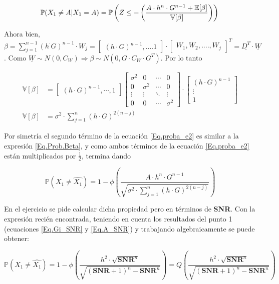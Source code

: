 			\begin{equation}
				\mathbb{P}(X_1 \neq A | X_1 = A) = \mathbb{P} \left( Z\leq - \left(\frac{A \cdot h^n \cdot G^{n-1} + \mathbb{E}[\beta]}{\mathbb{V}[\beta]} \right) \right)
				\label{Eq.Prob.Beta} \\
			\end{equation}

\indent Ahora bien, $\beta = \sum_{j=1}^{n-1} (h ^\cdot G)^{n-1} \cdot W_j = \begin{bmatrix} (h \cdot G)^{n-1}, .... 1 \end{bmatrix} \cdot \begin{bmatrix} W_1, W_2, ...., W_j \end{bmatrix} ^T = \underline{D^T} \cdot \underline{W}$. Como $\underline{W} \sim N(0,C_W) \Rightarrow \beta \sim N(0, G \cdot C_W \cdot G^T)$. Por lo tanto

				\begin{align*}
				\mathbb{V}[\beta] &= \begin{bmatrix} (h \cdot G)^{n-1}, \cdots ,1 \end{bmatrix} \begin{bmatrix} \sigma ^2 & 0 & \cdots & 0 \\ 0 & \sigma ^2 & \cdots & 0 \\ \vdots & \vdots & \ddots & \vdots \\ 0 & 0 & \cdots & \sigma ^2\end{bmatrix} \cdot \begin{bmatrix} (h \cdot G)^{n-1}\\ \vdots \\ 1 \end{bmatrix} \\
				\mathbb{V}[\beta] &= \sigma ^2 \cdot \sum_{j=1}^{n}(h \cdot G)^{2(n-j)}
				\end{align*}

\indent Por simetría el segundo término de la ecuación \ref{Eq.proba_e2} es similar a la expresión \ref{Eq.Prob.Beta}, y como ambos términos de la ecuación \ref{Eq.proba_e2} están multiplicados por $\frac{1}{2}$, termina dando

				\begin{equation}
				\mathbb{P}(X_1 \neq \widehat{X_1}) = 1 - \phi \left( \frac{A \cdot h^n \cdot G^{n-1}}{\sqrt{\sigma ^2 \cdot \sum_{j=1}^{n} (h \cdot G)^{2(n-j)}}}	 \right) 
				\end{equation}		

\indent En el ejercicio se pide calcular dicha propiedad pero en términos de \textbf{SNR}. Con la expresión recién encontrada, teniendo en cuenta los resultados del punto 1 (ecuaciones \ref{Eq.Gi_SNR} y \ref{Eq.A_SNR}) y trabajando algebraicamente se puede obtener:

				\begin{equation}
					\mathbb{P}(X_1 \neq \widehat{X_1}) = 1 - \phi \left( \frac{h^2 \cdot \sqrt{\textbf{SNR}^n}}{\sqrt{(\textbf{SNR}+1)^n -\textbf{SNR}^n}} \right)= Q \left( \frac{h^2 \cdot \sqrt{\textbf{SNR}^n}}{\sqrt{(\textbf{SNR}+1)^n -\textbf{SNR}^n}} \right)
					\label{Eq.prob_SNR}					
				\end{equation} 	